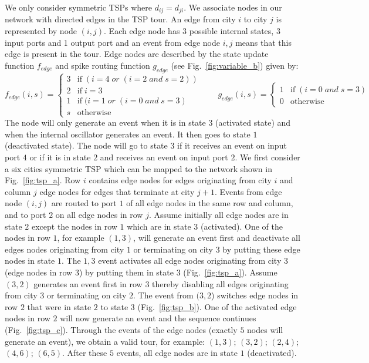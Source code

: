 \documentclass[10pt]{article}
\begin{document}
We only consider symmetric TSPs where $d_{ij} = d_{ji}$. We associate nodes in our network with directed edges in the TSP tour. An edge from city $i$ to city $j$ is represented by node $(i,j)$. Each edge node has $3$ possible internal states, 3 input ports and 1 output port and an event from edge node $i,j$ means that this edge is present in the tour. Edge nodes are described by the state update function $f_{edge}$ and spike routing function $g_{edge}$ (see Fig.~\ref{fig:variable_b}) given by:
\begin{equation*}
  f_{edge}(i,s) =
  \begin{cases}
    3 & \text{if}\; (i=4 \; or \; (i=2 \; and \; s=2 )) \\
    2 & \text{if}\; i=3 \\
    1 & \text{if}\; (i=1 \; or \; (i=0 \; and \; s=3) \\
    s & \text{otherwise} 
  \end{cases}
  \quad\quad
  g_{edge}(i,s) =
  \begin{cases}
    1 & \text{if}\; (i=0 \; and \; s=3) \\
    0       & \text{otherwise} 
  \end{cases}
\end{equation*}
The node will only generate an event when it is in state $3$ (activated state) and when the internal oscillator generates an event. It then goes to state $1$ (deactivated state). The node will go to state $3$ if it receives an event on input port $4$ or if it is in state $2$ and receives an event on input port $2$.
We first consider a six cities symmetric TSP which can be mapped to the network shown in Fig.~\ref{fig:tsp_a}. Row $i$ contains edge nodes for edges originating from city $i$ and column $j$ edge nodes for edges that terminate at city $j+1$. Events from edge node $(i,j)$ are routed to port $1$ of all edge nodes in the same row and column, and to port $2$ on all edge nodes in row $j$. Assume initially all edge nodes are in state $2$ except the nodes in row $1$ which are in state $3$ (activated). One of the nodes in row $1$, for example $(1,3)$, will generate an event first and deactivate all edges nodes originating from city $1$ or terminating on city $3$ by putting these edge nodes in state $1$. The $1,3$ event activates all edge nodes originating from city $3$ (edge nodes in row $3$) by putting them in state $3$ (Fig.~\ref{fig:tsp_a}). Assume $(3,2)$ generates an event first in row $3$ thereby disabling all edges originating from city $3$ or terminating on city $2$. The event from $(3,2$) switches edge nodes in row $2$ that were in state $2$ to state $3$ (Fig.~\ref{fig:tsp_b}). One of the activated edge nodes in row $2$ will now generate an event and the sequence continues (Fig.~\ref{fig:tsp_c}). Through the events of the edge nodes (exactly $5$ nodes will generate an event), we obtain a valid tour, for example: $(1,3)$; $(3,2)$; $(2,4)$; $(4,6)$; $(6,5)$.  After these $5$ events, all edge nodes are in state $1$ (deactivated). 
\end{document}

